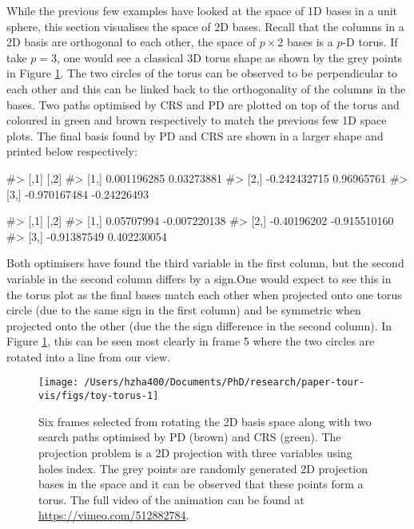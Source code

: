 While the previous few examples have looked at the space of 1D bases in
a unit sphere, this section visualises the space of 2D bases. Recall
that the columns in a 2D basis are orthogonal to each other, the space
of \(p \times 2\) bases is a \(p\)-D torus. If take \(p = 3\), one would
see a classical 3D torus shape as shown by the grey points in Figure
\ref{fig:toy-torus}. The two circles of the torus can be observed to be
perpendicular to each other and this can be linked back to the
orthogonality of the columns in the bases. Two paths optimised by CRS
and PD are plotted on top of the torus and coloured in green and brown
respectively to match the previous few 1D space plots. The final basis
found by PD and CRS are shown in a larger shape and printed below
respectively:

\begin{Schunk}
\begin{Soutput}
#>              [,1]        [,2]
#> [1,]  0.001196285  0.03273881
#> [2,] -0.242432715  0.96965761
#> [3,] -0.970167484 -0.24226493
\end{Soutput}
\end{Schunk}

\begin{Schunk}
\begin{Soutput}
#>             [,1]         [,2]
#> [1,]  0.05707994 -0.007220138
#> [2,] -0.40196202 -0.915510160
#> [3,] -0.91387549  0.402230054
\end{Soutput}
\end{Schunk}

Both optimisers have found the third variable in the first column, but
the second variable in the second column differs by a sign.One would
expect to see this in the torus plot as the final bases match each other
when projected onto one torus circle (due to the same sign in the first
column) and be symmetric when projected onto the other (due the the sign
difference in the second column). In Figure \ref{fig:toy-torus}, this
can be seen most clearly in frame 5 where the two circles are rotated
into a line from our view.

\begin{Schunk}
\begin{figure}

{\centering \texttt{[image: /Users/hzha400/Documents/PhD/research/paper-tour-vis/figs/toy-torus-1]} 

}

\caption{Six frames selected from rotating the 2D basis space along with two search paths optimised by PD (brown) and CRS (green). The projection problem is a 2D projection with three variables using holes index. The grey points are randomly generated 2D projection bases in the space and it can be observed that these points form a torus. The full video of the animation can be found at \url{https://vimeo.com/512882784}.}\label{fig:toy-torus}
\end{figure}
\end{Schunk}

